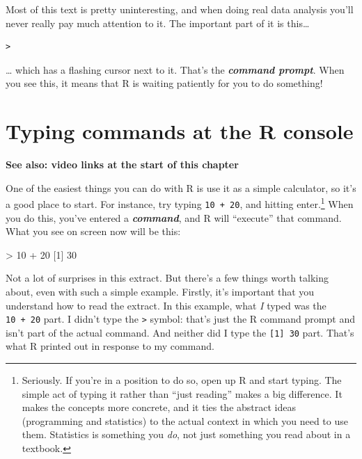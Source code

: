 \documentclass[
]{book}
\newenvironment{Shaded}{\begin{snugshade}}{\end{snugshade}}
\newcommand{\DecValTok}[1]{\textcolor[rgb]{0.00,0.00,0.81}{#1}}
\newcommand{\NormalTok}[1]{#1}
\newcommand{\SpecialCharTok}[1]{\textcolor[rgb]{0.00,0.00,0.00}{#1}}
\begin{document}
Most of this text is pretty uninteresting, and when doing real data analysis you'll never really pay much attention to it. The important part of it is this\ldots{}

\begin{verbatim}
>
\end{verbatim}

\ldots{} which has a flashing cursor next to it. That's the \textbf{\emph{command prompt}}. When you see this, it means that R is waiting patiently for you to do something!

\hypertarget{firstcommand}{%
\section{Typing commands at the R console}\label{firstcommand}}

\textbf{See also: video links at the start of this chapter}

One of the easiest things you can do with R is use it as a simple calculator, so it's a good place to start. For instance, try typing \texttt{10\ +\ 20}, and hitting enter.\footnote{Seriously. If you're in a position to do so, open up R and start typing. The simple act of typing it rather than ``just reading'' makes a big difference. It makes the concepts more concrete, and it ties the abstract ideas (programming and statistics) to the actual context in which you need to use them. Statistics is something you \emph{do}, not just something you read about in a textbook.} When you do this, you've entered a \textbf{\emph{command}}, and R will ``execute'' that command. What you see on screen now will be this:

\begin{Shaded}
\begin{Highlighting}[]
\SpecialCharTok{\textgreater{}} \DecValTok{10} \SpecialCharTok{+} \DecValTok{20}
\NormalTok{[}\DecValTok{1}\NormalTok{] }\DecValTok{30}
\end{Highlighting}
\end{Shaded}

Not a lot of surprises in this extract. But there's a few things worth talking about, even with such a simple example. Firstly, it's important that you understand how to read the extract. In this example, what \emph{I} typed was the \texttt{10\ +\ 20} part. I didn't type the \texttt{\textgreater{}} symbol: that's just the R command prompt and isn't part of the actual command. And neither did I type the \texttt{{[}1{]}\ 30} part. That's what R printed out in response to my command.
\end{document}
